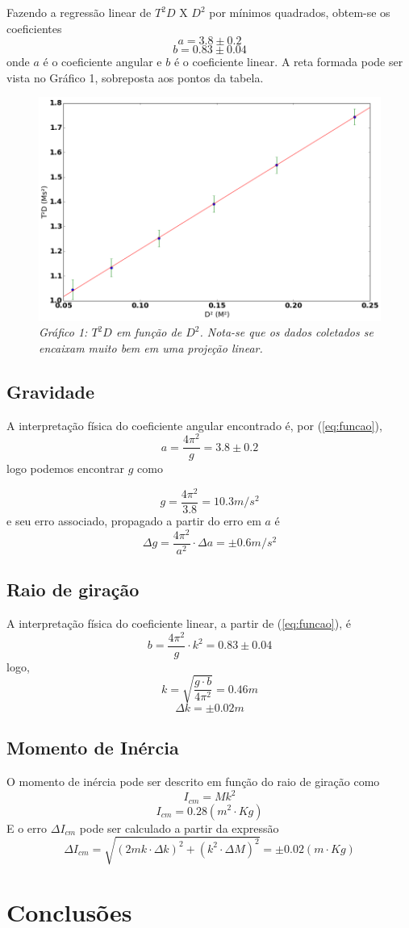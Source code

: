 \documentclass[12pt,a4paper]{article}
\begin{document}
Fazendo a regressão linear de $T^2D$ X $D^2$ por mínimos quadrados, obtem-se os coeficientes $$ a = 3.8 \pm 0.2 $$  $$ b = 0.83 \pm 0.04 $$ onde $a$ é o coeficiente angular e $b$ é o coeficiente linear. A reta formada pode ser vista no Gráfico 1, sobreposta aos pontos da tabela.

\begin{figure}[!hbtbp]

\includegraphics[scale=0.55]{index.png} 
\emph{Gráfico 1: $T^2D$ em função de $D^2$. Nota-se que os dados coletados se encaixam muito bem em uma projeção linear.}

\label{fig:Grafico}
\end{figure}
\subsection{Gravidade}
A interpretação física do coeficiente angular encontrado é, por (\ref{eq:funcao}),
 $$ a = \frac{4\pi^2}{g} = 3.8 \pm 0.2$$
  logo podemos encontrar $g$ como 

  $$ g = \frac{4\pi^2}{3.8} = 10.3 m/s^2 $$ 
  e seu erro associado, propagado a partir do erro em $a$ é
  $$ \Delta g = \frac{4\pi^2}{a^2} \cdot \Delta a = \pm 0.6 m/s^2 $$
  
\subsection{Raio de giração}

A interpretação física do coeficiente linear, a partir de (\ref{eq:funcao}), é 
$$ b = \frac{4\pi^2}{g} \cdot k^2 = 0.83 \pm 0.04 $$
logo, 
$$ k = \sqrt{\frac{g \cdot b}{4\pi^2}} = 0.46 m $$
$$ \Delta k = \pm 0.02  m$$

\subsection{Momento de Inércia}
O momento de inércia pode ser descrito em função do raio de giração como 
$$ I_{cm}  = Mk^2 $$
$$ I_{cm}  = 0.28 (m^2 \cdot Kg)$$
E o erro $ \Delta I_{cm}$ pode ser calculado a partir da expressão 
$$\Delta I_{cm}  =\sqrt{(2mk \cdot \Delta k)^2 + (k^2 \cdot \Delta M)^2} = \pm 0.02 (m \cdot Kg) $$

\section{Conclusões}
\end{document}
